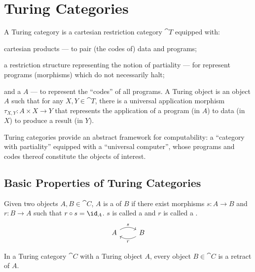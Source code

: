 \section{Turing Categories}

A Turing category is a cartesian restriction category
$\cat{T}$ equipped with:
\begin{enumarabic}
  \item cartesian products --- to pair (the codes of) data and programs;
  \item a restriction structure representing the
    notion of partiality --- for represent programs (morphisms)
    which do not necessarily halt;
  \item and a  $A$ --– to represent the
    ``codes'' of all programs.
    A Turing object is an object $A$ such that for any $X, Y \in \cat{T}$,
    there is a universal application morphism
    $\tau_{X, Y} : A \times X \to Y$
    that represents the application of a program (in $A$) to data (in $X$)
    to produce a result (in $Y$).~\cite{TURING-CATEGORIES}
\end{enumarabic}

Turing categories provide an abstract framework for computability:
a ``category with partiality'' equipped with a ``universal computer'',
whose programs and codes thereof constitute the objects of interest.
\cite{TURING-CATEGORIES}

\clearpage
\subsection{Basic Properties of Turing Categories}

\begin{definition}
  Given two objects $A, B \in \cat{C}$, $A$ is a  of $B$
  if there exist morphisms $s : A \to B$ and $r : B \to A$ such that
  $r \circ s = \id_A$.
  $s$ is called a  and $r$ is called a .
  \[
    \begin{tikzcd}
      A \arrow[r, "s", bend left] &B \arrow[l, "r", bend left]
    \end{tikzcd}
  \]
\end{definition}

\begin{lemma}
  In a Turing category $\cat{C}$ with a Turing object $A$,
  every object $B \in \cat{C}$ is a retract of $A$.
\end{lemma}

